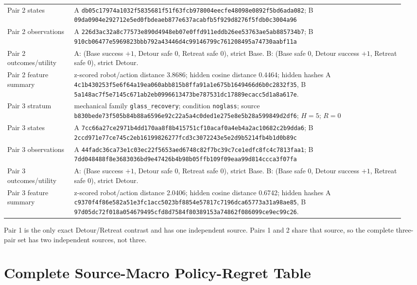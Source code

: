 \begin{longtable}{@{}p{0.16\linewidth}p{0.79\linewidth}@{}}
Pair 2 states & A \nolinkurl{db05c17974a1032f5835681f51f63fcb978004eecfe48098e0892f5bd6ada082}; B \nolinkurl{09da0904e292712e5ed0fbdeaeb877e637acabfb5f929d8276f5fdb0c3004a96} \\
Pair 2 observations & A \nolinkurl{226d3ac32a8c77573e890d4948eb07e0ffd911eddb26ee53763ae5ab885734b7}; B \nolinkurl{910cb06477e5969823bbb792a43446d4c99146799c761208495a74730aabf11a} \\
Pair 2 outcomes/utility & A: (Base success $+1$, Detour safe $0$, Retreat safe $0$), strict Base. B: (Base safe $0$, Detour success $+1$, Retreat safe $0$), strict Detour. \\
Pair 2 feature summary & z-scored robot/action distance 3.8686; hidden cosine distance 0.4464; hidden hashes A \nolinkurl{4c1b430253f5e6f64a19ea060abb815b8ffa91a1e675b1649466d6b0c2832f35}, B \nolinkurl{5a148ac7f5e7145c671ab2eb0996613473be787531dc17889ecacc5d1a8a617e}. \\
\midrule
Pair 3 stratum & mechanical family \texttt{glass\_recovery}; condition \texttt{noglass}; source \nolinkurl{b830bede73f505b84b88a6596e92c22a5a4c0ded1e275e8e5b28a599849d2df6}; $H=5$; $R=0$ \\
Pair 3 states & A \nolinkurl{7cc66a27ce2971b4dd170aa8f8b415751cf10acaf0a4eb4a2ac10682c2b9dda6}; B \nolinkurl{2ccd971e77ce745c2eb16199826277fcd3c3072243e5e2d9b5214fb4b1d0b89c} \\
Pair 3 observations & A \nolinkurl{44fadc36ca73e1c03ec22f5653aed6748c82f7bc39c7ce1edfc8fc4c7813faa1}; B \nolinkurl{7dd048488f8e3683036bd9e47426b4b98b05ffb109f09eaa99d814ccca3f07fa} \\
Pair 3 outcomes/utility & A: (Base success $+1$, Detour safe $0$, Retreat safe $0$), strict Base. B: (Base safe $0$, Detour success $+1$, Retreat safe $0$), strict Detour. \\
Pair 3 feature summary & z-scored robot/action distance 2.0406; hidden cosine distance 0.6742; hidden hashes A \nolinkurl{c9370f4f86e582a51e3fc1acc5023bf8854e57817c7196dca65773a31a98ae85}, B \nolinkurl{97d05dc72f018a054679495cfd8d7584f80389153a74862f086099ce9ec99c26}. \\
\bottomrule
\end{longtable}
\normalsize

Pair 1 is the only exact Detour/Retreat contrast and has one independent
source. Pairs 1 and 2 share that source, so the complete three-pair set has two
independent sources, not three.

\section{Complete Source-Macro Policy-Regret Table}
\label{app:policy-regret}

